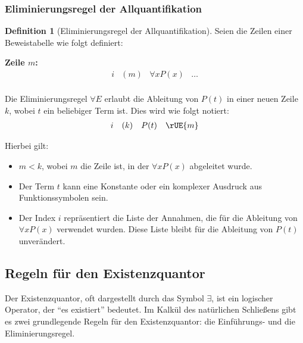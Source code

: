 \documentclass{book}
\theoremstyle{plain}
\theoremstyle{remark}
\theoremstyle{definition}
\newtheorem{definition}{Definition}[section]
\begin{document}
\subsubsection{Eliminierungsregel der  Allquantifikation}
\label{rule:UE}
\begin{definition}[Eliminierungsregel der Allquantifikation]
Seien die Zeilen einer Beweistabelle wie folgt definiert:

\textbf{Zeile \(m\):}
\[
\begin{array}{llll}
    i & (m) & \forall x P(x) & \dots \\
\end{array}
\]

Die Eliminierungsregel \(\forall E\) erlaubt die Ableitung von \(P(t)\) in einer neuen Zeile \(k\), wobei \(t\) ein beliebiger Term ist. Dies wird wie folgt notiert:
\[
\begin{array}{llll}
    i & (k) & P(t) & \rUE{m} \\
\end{array}
\]

Hierbei gilt:
\begin{itemize}
    \item \(m < k\), wobei \(m\) die Zeile ist, in der \(\forall x P(x)\) abgeleitet wurde.
    \item Der Term \(t\) kann eine Konstante oder ein komplexer Ausdruck aus Funktionssymbolen sein.
    \item Der Index \(i\) repräsentiert die Liste der Annahmen, die für die Ableitung von \(\forall x P(x)\) verwendet wurden. Diese Liste bleibt für die Ableitung von \(P(t)\) unverändert.
\end{itemize}
\end{definition}

\subsection{Regeln für den Existenzquantor}

Der Existenzquantor, oft dargestellt durch das Symbol \(\exists\), ist ein logischer Operator, der \enquote{es existiert} bedeutet. Im Kalkül des natürlichen Schließens gibt es zwei grundlegende Regeln für den Existenzquantor: die Einführungs- und die Eliminierungsregel.
\end{document}
